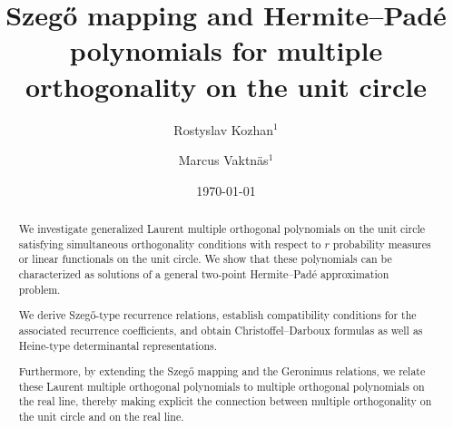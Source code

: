 \documentclass[reqno,centertags,11pt,draft]{amsart}
\newcommand{\rkno}[1]{{{\color{red}\sout{#1}}}}
\begin{document}
\title{
Szeg\H{o} mapping and Hermite--Pad\'{e} polynomials for multiple orthogonality on the unit circle
}
\date{\today}
\author{Rostyslav Kozhan$^1$}
\author{Marcus Vaktn\"as$^{1}$}
\address{$^{1}$Department of Mathematics, Uppsala University, S-751 06 Uppsala, Sweden}
\begin{abstract}
We investigate generalized Laurent multiple orthogonal polynomials on the unit circle satisfying simultaneous orthogonality conditions with respect to $r$ probability measures or linear functionals on the unit circle. We show that these polynomials can be characterized as solutions of a general two-point Hermite--Pad\'e approximation problem.

We derive Szeg\H{o}-type recurrence relations, establish compatibility conditions for the associated recurrence coefficients, and obtain Christoffel--Darboux formulas as well as Heine-type determinantal representations.

Furthermore, by extending the Szeg\H{o} mapping and the Geronimus relations, we relate these Laurent multiple orthogonal polynomials to multiple orthogonal polynomials on the real line, thereby making explicit the connection between multiple orthogonality on the unit circle and on the real line.





\end{abstract}
\maketitle
\end{document}
